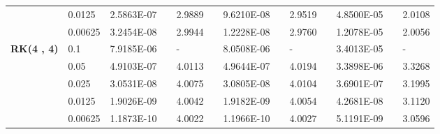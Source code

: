 \begin{table}[H]
\begin{tabular}{lllllrlrlrlrlrl}
\multicolumn{2}{l}{} & \multicolumn{2}{l}{0.0125} & 2.5863E-07 &       & 2.9889  &       & 9.6210E-08 &       & 2.9519  &       & 4.8500E-05 &       & 2.0108  \\
\multicolumn{2}{l}{} & \multicolumn{2}{l}{0.00625} & 3.2454E-08 &       & 2.9944  &       & 1.2228E-08 &       & 2.9760  &       & 1.2078E-05 &       & 2.0056  \\
\multicolumn{2}{l}{\multirow{5}[1]{*}{\textbf{RK(4 , 4)}}} & \multicolumn{2}{l}{0.1} & 7.9185E-06 &       & -     &       & 8.0508E-06 &       & -     &       & 3.4013E-05 &       & - \\
\multicolumn{2}{l}{} & \multicolumn{2}{l}{0.05} & 4.9103E-07 &       & 4.0113  &       & 4.9644E-07 &       & 4.0194  &       & 3.3898E-06 &       & 3.3268  \\
\multicolumn{2}{l}{} & \multicolumn{2}{l}{0.025} & 3.0531E-08 &       & 4.0075  &       & 3.0805E-08 &       & 4.0104  &       & 3.6901E-07 &       & 3.1995  \\
\multicolumn{2}{l}{} & \multicolumn{2}{l}{0.0125} & 1.9026E-09 &       & 4.0042  &       & 1.9182E-09 &       & 4.0054  &       & 4.2681E-08 &       & 3.1120  \\
\multicolumn{2}{l}{} & \multicolumn{2}{l}{0.00625} & 1.1873E-10 &       & 4.0022  &       & 1.1966E-10 &       & 4.0027  &       & 5.1191E-09 &       & 3.0596  \\
\bottomrule
\end{tabular}%
\label{tab_SAVRRK:6-2}%
\end{table}%
	
